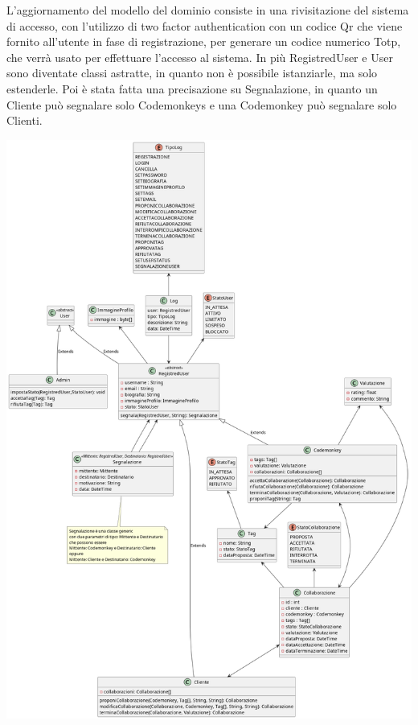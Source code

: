L'aggiornamento del modello del dominio consiste in una rivisitazione del sistema di accesso, con l'utilizzo di two factor authentication con un codice Qr che viene fornito all'utente in fase di registrazione, per generare un codice numerico Totp, che verrà usato per effettuare l'accesso al sistema. In più RegistredUser e User sono diventate classi astratte, in quanto non è possibile istanziarle, ma solo estenderle. Poi è stata fatta una precisazione su Segnalazione, in quanto un Cliente può segnalare solo Codemonkeys e una Codemonkey può segnalare solo Clienti.\\
\linebreak

\includegraphics[width=1\textwidth]{assets/plantuml/modello_di_dettaglio_del_dominio.png}\\
